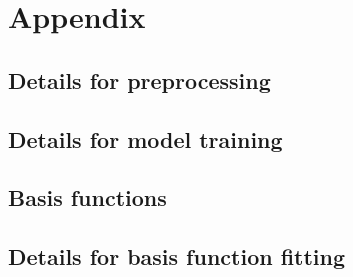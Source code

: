 \chapter{Appendix}

\section{Details for preprocessing}
\section{Details for model training}
\section{Basis functions}
\section{Details for basis function fitting}

